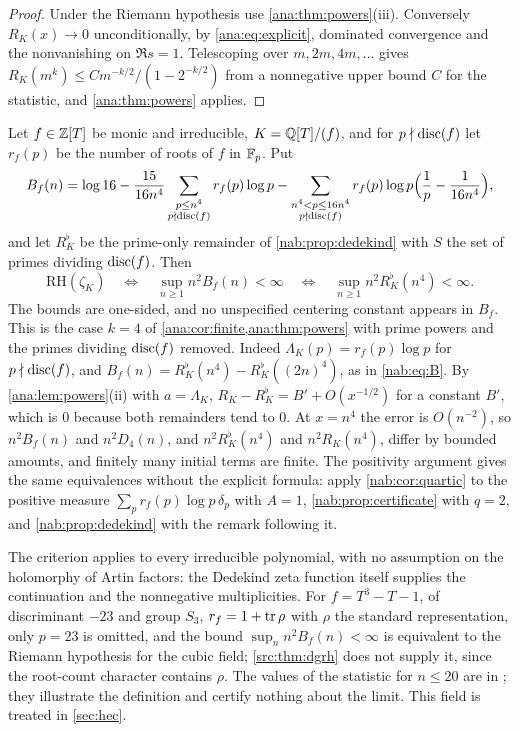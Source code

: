 \begin{proof}
Under the Riemann hypothesis use \cref{ana:thm:powers}(iii). Conversely $R_K(x)\to0$
unconditionally, by \eqref{ana:eq:explicit}, dominated convergence and the nonvanishing on
$\Re s=1$. Telescoping over $m,2m,4m,\dots$ gives $R_K(m^k)\le Cm^{-k/2}/(1-2^{-k/2})$ from a
nonnegative upper bound $C$ for the statistic, and \cref{ana:thm:powers} applies.
\end{proof}

\begin{remark}\label{nab:cor:rootcount}
Let $f\in\mathbb{Z}[T]$ be monic and irreducible, $K=\mathbb{Q}[T]/(f)$, and for $p\nmid\operatorname{disc}(f)$ let
$r_f(p)$ be the number of roots of $f$ in $\mathbb{F}_p$. Put
\[
 B_f(n)=\log16-\frac{15}{16n^4}\sum_{\substack{p\le n^4\\p\nmid\operatorname{disc}(f)}}r_f(p)\log p
 -\sum_{\substack{n^4<p\le16n^4\\p\nmid\operatorname{disc}(f)}}r_f(p)\log p\Bigl(\frac1p-\frac1{16n^4}\Bigr),
\]
and let $R_K^\flat$ be the prime-only remainder of \cref{nab:prop:dedekind} with $S$ the set of
primes dividing $\operatorname{disc}(f)$. Then
\[
 \mathrm{RH}(\zeta_K)\quad\Longleftrightarrow\quad\sup_{n\ge1}n^2B_f(n)<\infty
 \quad\Longleftrightarrow\quad\sup_{n\ge1}n^2R_K^\flat(n^4)<\infty .
\]
The bounds are one-sided, and no unspecified centering constant appears in $B_f$. This is the
case $k=4$ of \cref{ana:cor:finite,ana:thm:powers} with prime powers and the primes dividing
$\operatorname{disc}(f)$ removed. Indeed $\Lambda_K(p)=r_f(p)\log p$ for $p\nmid\operatorname{disc}(f)$, and
$B_f(n)=R_K^\flat(n^4)-R_K^\flat((2n)^4)$, as in \eqref{nab:eq:B}. By \cref{ana:lem:powers}(ii)
with $a=\Lambda_K$, $R_K-R_K^\flat=B'+O(x^{-1/2})$ for a constant $B'$, which is $0$ because
both remainders tend to $0$. At $x=n^4$ the error is $O(n^{-2})$, so $n^2B_f(n)$ and
$n^2D_4(n)$, and $n^2R_K^\flat(n^4)$ and $n^2R_K(n^4)$, differ by bounded amounts, and
finitely many initial terms are finite. The positivity argument gives the same equivalences
without the explicit formula: apply \cref{nab:cor:quartic} to the positive measure
$\sum_pr_f(p)\log p\,\delta_p$ with $A=1$, \cref{nab:prop:certificate} with $q=2$, and
\cref{nab:prop:dedekind} with the remark following it.

The criterion applies to every irreducible polynomial, with no assumption on the holomorphy of
Artin factors: the Dedekind zeta function itself supplies the continuation and the
nonnegative multiplicities. For $f=T^3-T-1$, of discriminant $-23$ and group $S_3$,
$r_f=1+\operatorname{tr}\rho$ with $\rho$ the standard representation, only $p=23$ is omitted, and the bound
$\sup_nn^2B_f(n)<\infty$ is equivalent to the Riemann hypothesis for the cubic field;
\cref{src:thm:dgrh} does not supply it, since the root-count character contains $\rho$. The
values of the statistic for $n\le20$ are in
; they illustrate the
definition and certify nothing about the limit. This field is treated in \cref{sec:hec}.
\end{remark}

